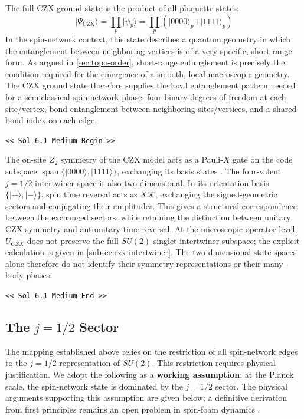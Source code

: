 \documentclass[preprint]{SciPost}
\newcommand{\ket}[1]{\vert #1 \rangle}
\theoremstyle{plain} %
\newcommand{\GPTBegin}{\par\noindent\textcolor{GPTMarker}{\texttt{\textless\textless{} Sol 6.1 Medium Begin \textgreater\textgreater}}\par}
\newcommand{\GPTEnd}{\par\noindent\textcolor{GPTMarker}{\texttt{\textless\textless{} Sol 6.1 Medium End \textgreater\textgreater}}\par}
\begin{document}
The full CZX ground state is the product of all plaquette states:
\begin{equation}\label{eqn:czx-full-gs}
	\ket{\Psi_{\text{CZX}}} = \prod_p \ket{\psi_p} = \prod_p \left( \ket{0000}_p + \ket{1111}_p \right)
\end{equation}
In the spin-network context, this state describes a quantum geometry in which the entanglement between neighboring vertices is of a very specific, short-range form. As argued in \autoref{sec:topo-order}, short-range entanglement is precisely the condition required for the emergence of a smooth, local macroscopic geometry. The CZX ground state therefore supplies the local entanglement pattern needed for a semiclassical spin-network phase: four binary degrees of freedom at each site/vertex, bond entanglement between neighboring sites/vertices, and a shared bond index on each edge.

\GPTBegin{}

The on-site $Z_2$ symmetry of the CZX model acts as a Pauli-$X$ gate on the code subspace $\operatorname{span}\{\ket{0000},\ket{1111}\}$, exchanging its basis states \cite{Chen2010Local}. The four-valent $j=1/2$ intertwiner space is also two-dimensional. In its orientation basis $\{\ket{+},\ket{-}\}$, spin time reversal acts as $X\mathcal K$, exchanging the signed-geometric sectors and conjugating their amplitudes. This gives a structural correspondence between the exchanged sectors, while retaining the distinction between unitary CZX symmetry and antiunitary time reversal. At the microscopic operator level, $U_{CZX}$ does not preserve the full $SU(2)$ singlet intertwiner subspace; the explicit calculation is given in \autoref{subsec:czx-intertwiner}. The two-dimensional state spaces alone therefore do not identify their symmetry representations or their many-body phases.

\GPTEnd{}


\subsection{The $ j = 1/2 $ Sector}\label{subsec:j-half-dominance}

The mapping established above relies on the restriction of all spin-network edges to the $ j = 1/2 $ representation of $ SU(2) $. This restriction requires physical justification. We adopt the following as a \textbf{working assumption}: at the Planck scale, the spin-network state is dominated by the $ j = 1/2 $ sector. The physical arguments supporting this assumption are given below; a definitive derivation from first principles remains an open problem in spin-foam dynamics \cite{Dona2020Numerical,Dona2022Asymptotics}.
\end{document}
